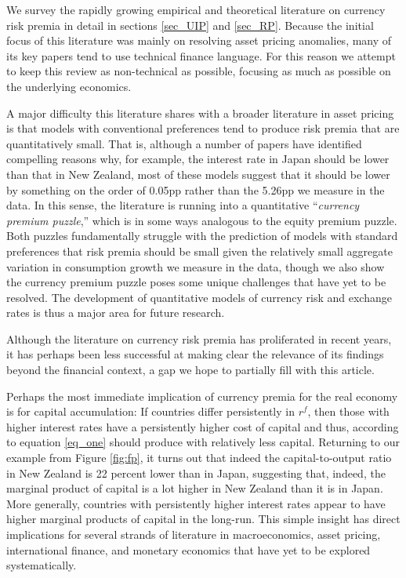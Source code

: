\documentclass{ar-1col}
\begin{document}
We survey the rapidly growing empirical and theoretical literature on currency risk premia in detail in sections \ref{sec_UIP} and \ref{sec_RP}. Because the initial focus of this literature was mainly on resolving asset pricing anomalies, many of its key papers tend to use technical finance language. For this reason we attempt to keep this review as non-technical as possible, focusing as much as possible on the underlying economics.

A major difficulty this literature shares with a broader literature in asset pricing is that models with conventional preferences tend to produce risk premia that are quantitatively small. That is, although a number of papers have identified compelling reasons why, for example, the interest rate in Japan should be lower than that in New Zealand, most of these models suggest that it should be lower by something on the order of 0.05pp rather than the 5.26pp we measure in the data. In this sense, the literature is running into a quantitative ``\textit{currency premium puzzle},'' which is in some ways analogous to the equity premium puzzle. Both puzzles fundamentally struggle with the prediction of models with standard preferences that risk premia should be small given the relatively small aggregate variation in consumption growth we measure in the data, though we also show the currency premium puzzle poses some unique challenges that have yet to be resolved. The development of quantitative models of currency risk and exchange rates is thus a major area for future research.

Although the literature on currency risk premia has proliferated in recent years, it has perhaps been less successful at making clear the relevance of its findings beyond the financial context, a gap we hope to partially fill with this article.

Perhaps the most immediate implication of currency premia for the real economy is for capital accumulation: If countries differ persistently in $r^f$, then those with higher interest rates have a persistently higher cost of capital and thus, according to equation \ref{eq_one} should produce with relatively less capital. Returning to our example from Figure \ref{fig:fp}, it turns out that indeed the capital-to-output ratio in New Zealand is 22 percent lower than in Japan, suggesting that, indeed, the marginal product of capital is a lot higher in New Zealand than it is in Japan. More generally, countries with persistently higher interest rates appear to have higher marginal products of capital in the long-run. This simple insight has direct implications for several strands of literature in macroeconomics, asset pricing, international finance, and monetary economics that have yet to be explored systematically.
\end{document}
